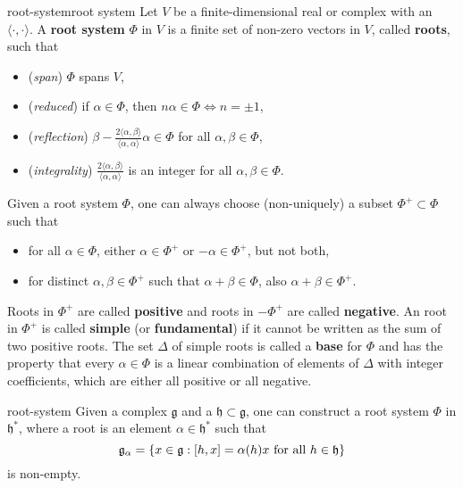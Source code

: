 \begin{topic}{root-system}{root system}
    Let $V$ be a finite-dimensional real or complex  with an  $\langle \cdot, \cdot \rangle$. A \textbf{root system} $\Phi$ in $V$ is a finite set of non-zero vectors in $V$, called \textbf{roots}, such that
    \begin{itemize}
        \item (\textit{span}) $\Phi$ spans $V$,
        \item (\textit{reduced}) if $\alpha \in \Phi$, then $n \alpha \in \Phi \iff n = \pm 1$,
        \item (\textit{reflection}) $\beta - \frac{2 \langle \alpha, \beta \rangle}{\langle \alpha, \alpha \rangle} \alpha \in \Phi$ for all $\alpha, \beta \in \Phi$,
        \item (\textit{integrality}) $\frac{2 \langle \alpha, \beta \rangle}{\langle \alpha, \alpha \rangle}$ is an integer for all $\alpha, \beta \in \Phi$.
    \end{itemize}
    Given a root system $\Phi$, one can always choose (non-uniquely) a subset $\Phi^+ \subset \Phi$ such that
    \begin{itemize}
        \item for all $\alpha \in \Phi$, either $\alpha \in \Phi^+$ or $-\alpha \in \Phi^+$, but not both,
        \item for distinct $\alpha, \beta \in \Phi^+$ such that $\alpha + \beta \in \Phi$, also $\alpha + \beta \in \Phi^+$.
    \end{itemize}
    Roots in $\Phi^+$ are called \textbf{positive} and roots in $-\Phi^+$ are called \textbf{negative}. An root in $\Phi^+$ is called \textbf{simple} (or \textbf{fundamental}) if it cannot be written as the sum of two positive roots. The set $\Delta$ of simple roots is called a \textbf{base} for $\Phi$ and has the property that every $\alpha \in \Phi$ is a linear combination of elements of $\Delta$ with integer coefficients, which are either all positive or all negative.
\end{topic}

\begin{example}{root-system}
    Given a complex  $\mathfrak{g}$ and a  $\mathfrak{h} \subset \mathfrak{g}$, one can construct a root system $\Phi$ in $\mathfrak{h}^*$, where a root is an element $\alpha \in \mathfrak{h}^*$ such that
    \[ \mathfrak{g}_\alpha = \{ x \in \mathfrak{g} : [h, x] = \alpha(h) x \textup{ for all } h \in \mathfrak{h} \} \]
    is non-empty.
\end{example}

